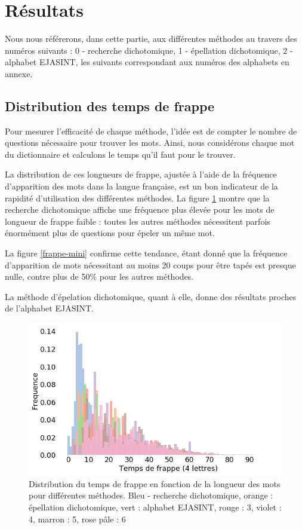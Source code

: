 \documentclass[twoside,twocolumn]{article}
\begin{document}

\section{Résultats}

Nous nous référerons, dans cette partie, aux différentes méthodes au travers des numéros suivants : 0 - recherche dichotomique, 1 - épellation dichotomique, 2 - alphabet EJASINT, les suivants correspondant aux numéros des alphabets en annexe.

\subsection{Distribution des temps de frappe}

Pour mesurer l'efficacité de chaque méthode, l'idée est de compter le nombre de questions nécessaire pour trouver les mots. Ainsi, nous considérons chaque mot du dictionnaire et calculons le temps qu'il faut pour le trouver.

La distribution de ces longueurs de frappe, ajustée à l'aide de la fréquence d'apparition des mots dans la langue française, est un bon indicateur de la rapidité d'utilisation des différentes méthodes. La figure \ref{distrib} montre que la recherche dichotomique affiche une fréquence plus élevée pour les mots de longueur de frappe faible : toutes les autres méthodes nécessitent parfois énormément plus de questions pour épeler un même mot. 

La figure \ref{frappe-mini} confirme cette tendance, étant donné que la fréquence d'apparition de mots nécessitant au moins 20 coups pour être tapés est presque nulle, contre plus de 50\% pour les autres méthodes.

La méthode d'épelation dichotomique, quant à elle, donne des résultats proches de l'alphabet EJASINT.
\begin{center}
\begin{figure}
  \includegraphics[scale=0.35]{distrib.png}
  \caption{Distribution du temps de frappe en fonction de la longueur des mots pour différentes méthodes. Bleu - recherche dichotomique, orange : épellation dichotomique, vert : alphabet EJASINT, rouge : 3, violet : 4, marron : 5, rose pâle : 6}
  \label{distrib}
\end{figure}
\end{center}
\end{document}
